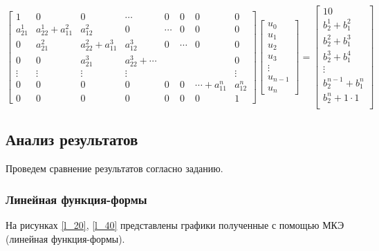 $$
\begin{bmatrix}
1     &   0        &   0 & \cdots & 0 & 0 & 0  & 0\\
a_{21}^1     &    a_{22}^1+a_{11}^2 & a_{12}^2  & 0 & \cdots & 0 & 0  & 0\\
0     &    a_{21}^2 & a_{22}^2+a_{11}^3  &  a_{12}^3  & 0 & \cdots & 0  & 0\\
0     &    0  & a_{21}^3  & a_{22}^3+ \cdots  &  & &   & 0\\
\vdots & \vdots & \vdots & \vdots &  &  &   & \vdots\\
0 & 0 & 0 & 0 &  0 & 0 & \cdots+a_{11}^n  & a_{12}^n\\
0 & 0 & 0 & 0 &  0 & 0 & 0 & 1
\end{bmatrix}
\begin{bmatrix}
u_0 \\
u_1 \\
u_2\\
u_3\\
\vdots\\
u_{n-1}\\
u_n
\end{bmatrix} =
\begin{bmatrix}
 10   \\
b_2^1+b_1^2\\
b_2^2+b_1^3\\
b_2^3+b_1^4\\
\vdots\\
b_2^{n-1}+b_1^n\\
 b_2^n   +1  \cdot 1   \\
\end{bmatrix}
$$

\subsection{Анализ результатов}

Проведем сравнение результатов согласно заданию.

\subsubsection{Линейная функция-формы}


На рисунках \ref{l_20}, \ref{l_40} представлены графики полученные с помощью МКЭ (линейная функция-формы).

